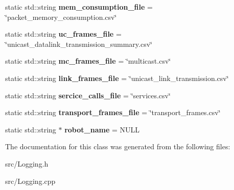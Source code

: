 \begin{DoxyCompactItemize}
\item 
\hypertarget{classLogging_a3619464994ccecfd225ecf1c0ff5a9fb}{static std\-::string {\bfseries mem\-\_\-consumption\-\_\-file} = \char`\"{}packet\-\_\-memory\-\_\-consumption.\-csv\char`\"{}}\label{classLogging_a3619464994ccecfd225ecf1c0ff5a9fb}

\item 
\hypertarget{classLogging_acbc1f83a16e0c7d4975f8b2549ede345}{static std\-::string {\bfseries uc\-\_\-frames\-\_\-file} = \char`\"{}unicast\-\_\-datalink\-\_\-transmission\-\_\-summary.\-csv\char`\"{}}\label{classLogging_acbc1f83a16e0c7d4975f8b2549ede345}

\item 
\hypertarget{classLogging_a6cef4ce1d28d43807658dfacfe55d4ca}{static std\-::string {\bfseries mc\-\_\-frames\-\_\-file} = \char`\"{}multicast.\-csv\char`\"{}}\label{classLogging_a6cef4ce1d28d43807658dfacfe55d4ca}

\item 
\hypertarget{classLogging_a4334f9d5202f158c38d83ecf7e0fef65}{static std\-::string {\bfseries link\-\_\-frames\-\_\-file} = \char`\"{}unicast\-\_\-link\-\_\-transmission.\-csv\char`\"{}}\label{classLogging_a4334f9d5202f158c38d83ecf7e0fef65}

\item 
\hypertarget{classLogging_a8c8a57b58cab81a3ed01273a972561c2}{static std\-::string {\bfseries sercice\-\_\-calls\-\_\-file} = \char`\"{}services.\-csv\char`\"{}}\label{classLogging_a8c8a57b58cab81a3ed01273a972561c2}

\item 
\hypertarget{classLogging_aa304f9fb8b6090b74c6af85e57d16a9b}{static std\-::string {\bfseries transport\-\_\-frames\-\_\-file} = \char`\"{}transport\-\_\-frames.\-csv\char`\"{}}\label{classLogging_aa304f9fb8b6090b74c6af85e57d16a9b}

\item 
\hypertarget{classLogging_abb6d88651d3fe9725d8a54a2a8637c2c}{static std\-::string $\ast$ {\bfseries robot\-\_\-name} = N\-U\-L\-L}\label{classLogging_abb6d88651d3fe9725d8a54a2a8637c2c}

\end{DoxyCompactItemize}


The documentation for this class was generated from the following files\-:\begin{DoxyCompactItemize}
\item 
src/Logging.\-h\item 
src/Logging.\-cpp\end{DoxyCompactItemize}
